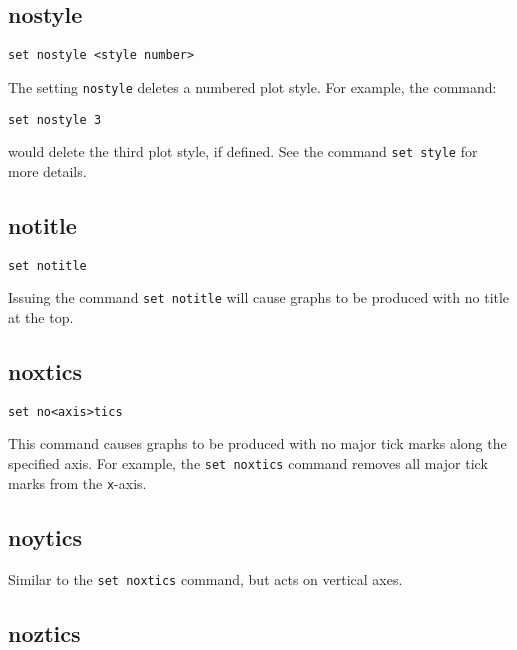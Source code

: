 \subsection{nostyle}

\begin{verbatim}
set nostyle <style number>
\end{verbatim}

The setting {\tt nostyle} deletes a numbered plot style. For example, the command:

\begin{verbatim}
set nostyle 3
\end{verbatim}

\noindent would delete the third plot style, if defined. See the command {\tt set
style} for more details.


\subsection{notitle}

\begin{verbatim}
set notitle
\end{verbatim}

Issuing the command {\tt set notitle} will cause graphs to be produced with no
title at the top.


\subsection{noxtics}

\begin{verbatim}
set no<axis>tics
\end{verbatim}

This command causes graphs to be produced with no major tick marks along the
specified axis. For example, the {\tt set noxtics} command removes all major
tick marks from the {\tt x}-axis.


\subsection{noytics}

Similar to the {\tt set noxtics} command, but acts on vertical axes.


\subsection{noztics}

